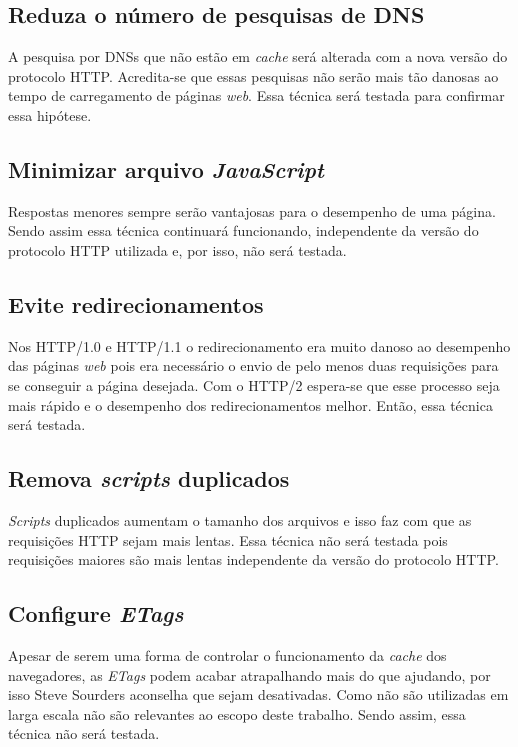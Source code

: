 \subsection{Reduza o número de pesquisas de DNS}
\label{subsec:preliminares_tec9}
A pesquisa por DNSs que não estão em \textit{cache} será alterada com a nova versão do protocolo HTTP. Acredita-se que essas pesquisas não serão mais tão danosas ao tempo de carregamento de páginas \textit{web}. Essa técnica será testada para confirmar essa hipótese.


\subsection{Minimizar arquivo \textit{JavaScript}}
\label{subsec:preliminares_tec10}
Respostas menores sempre serão vantajosas para o desempenho de uma página. Sendo assim essa técnica continuará funcionando, independente da versão do protocolo HTTP utilizada e, por isso, não será testada.

\subsection{Evite redirecionamentos}
\label{subsec:preliminares_tec11}
Nos HTTP/1.0 e HTTP/1.1 o redirecionamento era muito danoso ao desempenho das páginas \textit{web} pois era necessário o envio de pelo menos duas requisições para se conseguir a página desejada. Com o HTTP/2 espera-se que esse processo seja mais rápido e o desempenho dos redirecionamentos melhor. Então, essa técnica será testada.

\subsection{Remova \textit{scripts} duplicados}
\label{subsec:preliminares_tec12}
\textit{Scripts} duplicados aumentam o tamanho dos arquivos e isso faz com que as requisições HTTP sejam mais lentas. Essa técnica não será testada pois requisições maiores são mais lentas independente da versão do protocolo HTTP.

\subsection{Configure \textit{ETags}}
\label{subsec:preliminares_tec13}
Apesar de serem uma forma de controlar o funcionamento da \textit{cache} dos navegadores, as \textit{ETags} podem acabar atrapalhando mais do que ajudando, por isso Steve Sourders aconselha que sejam desativadas. Como não são utilizadas em larga escala não são relevantes ao escopo deste trabalho. Sendo assim, essa técnica não será testada.

